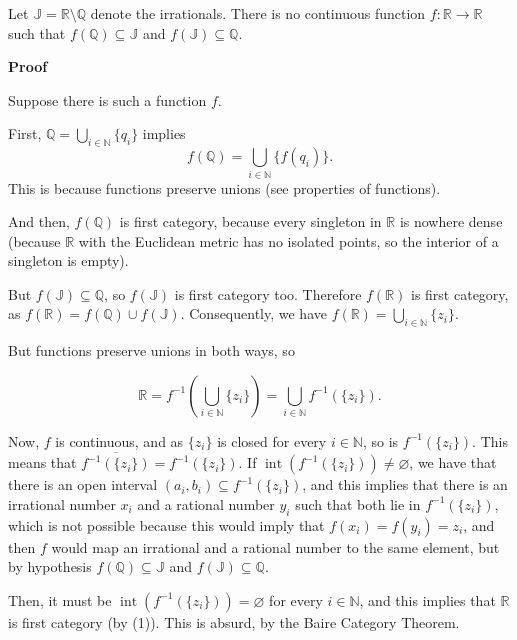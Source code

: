 \documentclass[12pt]{article}
\def\J{\mathbb{J}}
\def\N{\mathbb{N}}
\def\Q{\mathbb{Q}}
\def\R{\mathbb{R}}
\begin{document}
Let $\J=\R\setminus\Q$ denote the irrationals.
There is no continuous function $f\colon \R \to \R$
such that $f(\Q)\subseteq \J$ and $f(\J)\subseteq\Q$.

\textbf{Proof}

Suppose there is such a function $f$.

First, $\Q = \bigcup\limits_{i \in \N } {\{q_i\}}$ implies 
\[
  f(\Q) = \bigcup \limits_{i \in \N } {\{f(q_i)\}}.
\]
This is because functions preserve unions (see properties of functions).

And then, $f(\Q)$ is first category, because every singleton in $\R$ is nowhere dense (because $\R$ with the Euclidean metric has no isolated points, so the interior of a singleton is empty).

But $f(\J) \subseteq \Q$, so $f(\J)$ is first category too.
Therefore $f(\R)$ is first category, as $f(\R) = f(\Q) \cup f(\J)$.
Consequently, we have $f(\R ) = \bigcup \limits_{i \in \N } {\{z_i\}}$.

But functions preserve unions in both ways, so

\begin{equation}
\R  = f^{-1}(\bigcup \limits_{i \in \N } {\{z_i\}}) = \bigcup \limits_{i \in \N } {f^{-1}(\{z_i\})}.
\end{equation}

Now, $f$ is continuous, and as $\{z_i\}$ is closed for every $i \in \N $, so is $f^{-1}(\{z_i\})$. This means that $\overline{f^{-1}(\{z_i\})} = f^{-1}(\{z_i\})$. If $\operatorname{int}(f^{-1}(\{z_i\})) \neq \varnothing$, we have that there is an open interval $(a_i, b_i) \subseteq f^{-1}(\{z_i\})$, and this implies that there is an irrational number $x_i$ and a rational number $y_i$ such that both lie in $f^{-1}(\{z_i\})$, which is not possible because this would imply that $f(x_i) = f(y_i) = z_i$, and then $f$ would map an irrational and a rational number to the same element, but by hypothesis $f(\Q)\subseteq \J $ and $f(\J)\subseteq \Q$.

Then, it must be $\operatorname{int}(f^{-1}(\{z_i\})) = \varnothing$ for every $i \in \N$, and this implies that $\R$ is first category (by (1)).
This is absurd, by the Baire Category Theorem.

\end{document}
